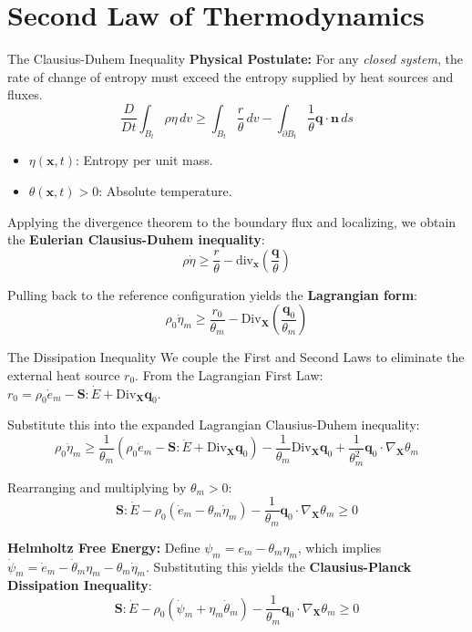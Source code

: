 \documentclass[aspectratio=169]{beamer}
\begin{document}
\section{Second Law of Thermodynamics}

\begin{frame}{The Clausius-Duhem Inequality}
    \textbf{Physical Postulate:} For any \emph{closed system}, the rate of change of entropy must exceed the entropy supplied by heat sources and fluxes.
    $$ \frac{D}{Dt} \int_{B_t} \rho \eta \, dv \ge \int_{B_t} \frac{r}{\theta} \, dv - \int_{\partial B_t} \frac{1}{\theta} \bm{q} \cdot \bm{n} \, ds $$
    \begin{itemize}
        \item $\eta(\bm{x}, t)$: Entropy per unit mass.
        \item $\theta(\bm{x}, t) > 0$: Absolute temperature.
    \end{itemize}
    
    Applying the divergence theorem to the boundary flux and localizing, we obtain the \textbf{Eulerian Clausius-Duhem inequality}:
    $$ \rho \dot{\eta} \ge \frac{r}{\theta} - \text{div}_{\bm{x}} \left( \frac{\bm{q}}{\theta} \right) $$
    
    Pulling back to the reference configuration yields the \textbf{Lagrangian form}:
    $$ \rho_0 \dot{\eta}_m \ge \frac{r_0}{\theta_m} - \text{Div}_{\bm{X}} \left( \frac{\bm{q}_0}{\theta_m} \right) $$
\end{frame}

\begin{frame}{The Dissipation Inequality}
    We couple the First and Second Laws to eliminate the external heat source $r_0$. 
    From the Lagrangian First Law: $r_0 = \rho_0 \dot{e}_m - \bm{S} : \dot{E} + \text{Div}_{\bm{X}} \bm{q}_0$.
    
    Substitute this into the expanded Lagrangian Clausius-Duhem inequality:
    $$ \rho_0 \dot{\eta}_m \ge \frac{1}{\theta_m} \left( \rho_0 \dot{e}_m - \bm{S} : \dot{E} + \text{Div}_{\bm{X}} \bm{q}_0 \right) - \frac{1}{\theta_m} \text{Div}_{\bm{X}} \bm{q}_0 + \frac{1}{\theta_m^2} \bm{q}_0 \cdot \nabla_{\bm{X}} \theta_m $$
    
    Rearranging and multiplying by $\theta_m > 0$:
    $$ \bm{S} : \dot{E} - \rho_0 (\dot{e}_m - \theta_m \dot{\eta}_m) - \frac{1}{\theta_m} \bm{q}_0 \cdot \nabla_{\bm{X}} \theta_m \ge 0 $$
    
    \textbf{Helmholtz Free Energy:} Define $\psi_m = e_m - \theta_m \eta_m$, which implies $\dot{\psi}_m = \dot{e}_m - \dot{\theta}_m \eta_m - \theta_m \dot{\eta}_m$. Substituting this yields the \textbf{Clausius-Planck Dissipation Inequality}:
    $$ \bm{S} : \dot{E} - \rho_0 (\dot{\psi}_m + \eta_m \dot{\theta}_m) - \frac{1}{\theta_m} \bm{q}_0 \cdot \nabla_{\bm{X}} \theta_m \ge 0 $$
\end{frame}
\end{document}
